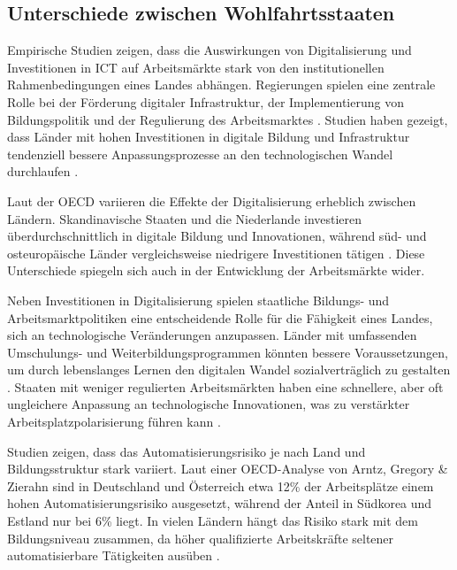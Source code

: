 
\subsection{Unterschiede zwischen Wohlfahrtsstaaten}

Empirische Studien zeigen, dass die Auswirkungen von Digitalisierung und Investitionen in
\ac{ICT} auf Arbeitsmärkte stark von den institutionellen Rahmenbedingungen eines Landes 
abhängen. Regierungen spielen eine zentrale Rolle bei der Förderung digitaler Infrastruktur, 
der Implementierung von Bildungspolitik und der Regulierung des 
Arbeitsmarktes \parencite[vgl.][S. 4–5]{hall2001varieties}. Studien haben gezeigt, dass 
Länder mit hohen Investitionen in digitale Bildung und Infrastruktur tendenziell bessere 
Anpassungsprozesse an den technologischen Wandel durchlaufen 
\parencite[vgl.][S. 22–23]{oecd2020digital}.

Laut der \ac{OECD} variieren die Effekte der Digitalisierung erheblich zwischen 
Ländern. Skandinavische Staaten und die Niederlande investieren überdurchschnittlich in 
digitale Bildung und Innovationen, während süd- und osteuropäische Länder vergleichsweise 
niedrigere Investitionen tätigen \parencite[vgl.][S. 24]{oecd2020digital}. Diese 
Unterschiede spiegeln sich auch in der Entwicklung der Arbeitsmärkte wider.

Neben Investitionen in Digitalisierung spielen staatliche Bildungs- und 
Arbeitsmarktpolitiken eine entscheidende Rolle für die Fähigkeit eines Landes, sich an 
technologische Veränderungen anzupassen. Länder mit umfassenden Umschulungs- und 
Weiterbildungsprogrammen könnten bessere Voraussetzungen, um durch lebenslanges Lernen 
den digitalen Wandel sozialverträglich zu gestalten \parencite[vgl.][S. 370–371]{vu2011ict}. 
Staaten mit weniger regulierten Arbeitsmärkten haben eine schnellere, aber oft ungleichere 
Anpassung an technologische Innovationen, was zu verstärkter Arbeitsplatzpolarisierung führen 
kann \parencite[vgl.][S. 27–28]{hall2001varieties}.

Studien zeigen, dass das Automatisierungsrisiko je nach Land und Bildungsstruktur stark 
variiert. Laut einer OECD-Analyse von Arntz, Gregory \& Zierahn sind in Deutschland und 
Österreich etwa 12\% der Arbeitsplätze einem hohen Automatisierungsrisiko ausgesetzt, 
während der Anteil in Südkorea und Estland nur bei 6\% liegt. In vielen Ländern hängt 
das Risiko stark mit dem Bildungsniveau zusammen, da höher qualifizierte Arbeitskräfte 
seltener automatisierbare Tätigkeiten ausüben \parencite[vgl.][S. 15–16]{arntz2016therisk}. 

